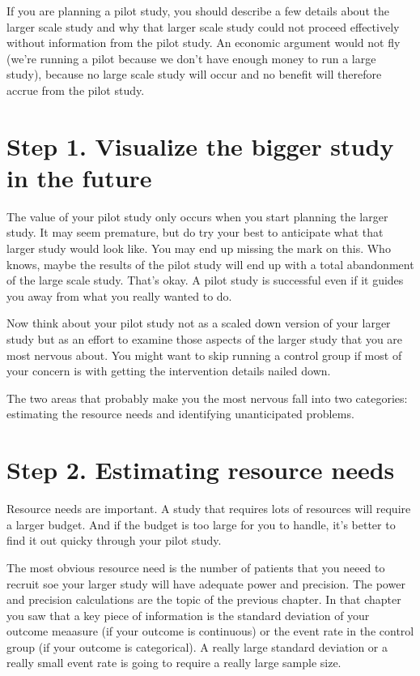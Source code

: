 \documentclass[
  letterpaper,
  DIV=11,
  numbers=noendperiod]{scrreprt}
\begin{document}
If you are planning a pilot study, you should describe a few details
about the larger scale study and why that larger scale study could not
proceed effectively without information from the pilot study. An
economic argument would not fly (we're running a pilot because we don't
have enough money to run a large study), because no large scale study
will occur and no benefit will therefore accrue from the pilot study.

\section{Step 1. Visualize the bigger study in the
future}\label{step-1.-visualize-the-bigger-study-in-the-future}

The value of your pilot study only occurs when you start planning the
larger study. It may seem premature, but do try your best to anticipate
what that larger study would look like. You may end up missing the mark
on this. Who knows, maybe the results of the pilot study will end up
with a total abandonment of the large scale study. That's okay. A pilot
study is successful even if it guides you away from what you really
wanted to do.

Now think about your pilot study not as a scaled down version of your
larger study but as an effort to examine those aspects of the larger
study that you are most nervous about. You might want to skip running a
control group if most of your concern is with getting the intervention
details nailed down.

The two areas that probably make you the most nervous fall into two
categories: estimating the resource needs and identifying unanticipated
problems.

\section{Step 2. Estimating resource
needs}\label{step-2.-estimating-resource-needs}

Resource needs are important. A study that requires lots of resources
will require a larger budget. And if the budget is too large for you to
handle, it's better to find it out quicky through your pilot study.

The most obvious resource need is the number of patients that you neeed
to recruit soe your larger study will have adequate power and precision.
The power and precision calculations are the topic of the previous
chapter. In that chapter you saw that a key piece of information is the
standard deviation of your outcome meaasure (if your outcome is
continuous) or the event rate in the control group (if your outcome is
categorical). A really large standard deviation or a really small event
rate is going to require a really large sample size.
\end{document}
